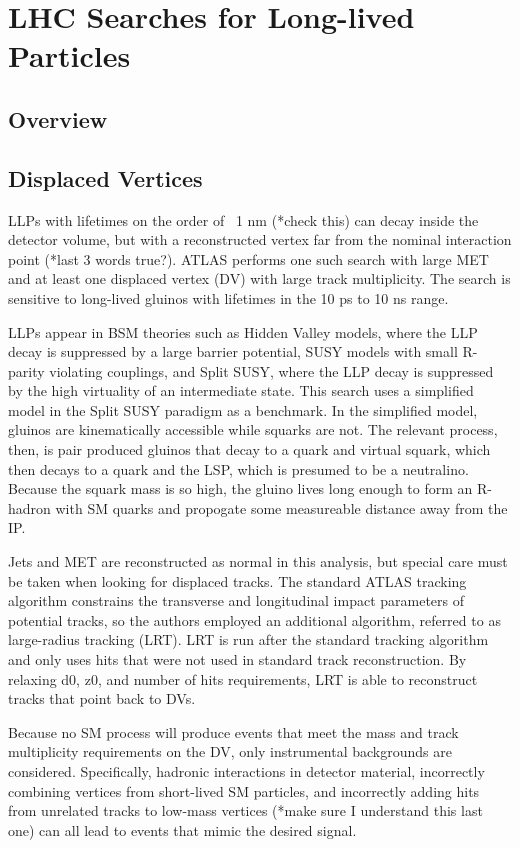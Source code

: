 \documentclass[12pt]{article}
\begin{document}
\section{LHC Searches for Long-lived Particles}
\subsection{Overview}
\subsection{Displaced Vertices}
            LLPs with lifetimes on the order of ~1 nm (*check this) can decay inside the detector volume, but with a reconstructed vertex far from the nominal interaction point (*last 3 words true?). ATLAS performs one such search with large MET and at least one displaced vertex (DV) with large track multiplicity. The search is sensitive to long-lived gluinos with lifetimes in the 10 ps to 10 ns range.

            LLPs appear in BSM theories such as Hidden Valley models, where the LLP decay is suppressed by a large barrier potential, SUSY models with small R-parity violating couplings, and Split SUSY, where the LLP decay is suppressed by the high virtuality of an intermediate state. This search uses a simplified model in the Split SUSY paradigm as a benchmark. In the simplified model, gluinos are kinematically accessible while squarks are not. The relevant process, then, is pair produced gluinos that decay to a quark and virtual squark, which then decays to a quark and the LSP, which is presumed to be a neutralino. Because the squark mass is so high, the gluino lives long enough to form an R-hadron with SM quarks and propogate some measureable distance away from the IP. 

            Jets and MET are reconstructed as normal in this analysis, but special care must be taken when looking for displaced tracks. The standard ATLAS tracking algorithm constrains the transverse and longitudinal impact parameters of potential tracks, so the authors employed an additional algorithm, referred to as large-radius tracking (LRT). LRT is run after the standard tracking algorithm and only uses hits that were not used in standard track reconstruction. By relaxing d0, z0, and number of hits requirements, LRT is able to reconstruct tracks that point back to DVs.
            
            Because no SM process will produce events that meet the mass and track multiplicity requirements on the DV, only instrumental backgrounds are considered. Specifically, hadronic interactions in detector material, incorrectly combining vertices from short-lived SM particles, and incorrectly adding hits from unrelated tracks to low-mass vertices (*make sure I understand this last one) can all lead to events that mimic the desired signal.
\end{document}
